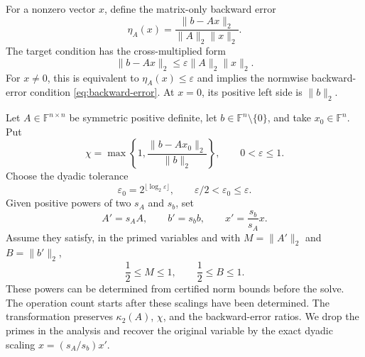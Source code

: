 \documentclass[11pt]{article}
\theoremstyle{definition}
\begin{document}
For a nonzero vector $x$, define the matrix-only backward error
\begin{equation}
 \eta_A(x)=\frac{\|b-Ax\|_2}{\|A\|_2\|x\|_2}.
 \label{eq:matrix-only-eta}
\end{equation}
The target condition has the cross-multiplied form
\begin{equation}
 \|b-Ax\|_2\le\varepsilon\|A\|_2\|x\|_2.
 \label{eq:matrix-only-cross}
\end{equation}
For $x\ne0$, this is equivalent to $\eta_A(x)\le\varepsilon$ and implies
the normwise backward-error condition \eqref{eq:backward-error}.
At $x=0$, its positive left side is $\|b\|_2$.

Let $A\in\mathbb F^{n\times n}$ be symmetric positive definite, let
$b\in\mathbb F^n\setminus\{0\}$, and take $x_0\in\mathbb F^n$.  Put
\[
 \chi=\max\left\{1,\frac{\|b-Ax_0\|_2}{\|b\|_2}\right\},
 \qquad 0<\varepsilon\le1.
\]
Choose the dyadic tolerance
\begin{equation}
 \varepsilon_0=2^{\lfloor\log_2\varepsilon\rfloor},
 \qquad \varepsilon/2<\varepsilon_0\le\varepsilon.
 \label{eq:dyadic-tolerance}
\end{equation}
Given positive powers of two $s_A$ and $s_b$, set
\begin{equation}
 A'=s_AA,\qquad b'=s_bb,\qquad x'=\frac{s_b}{s_A}x.
 \label{eq:cg-scaling-map}
\end{equation}
Assume they satisfy, in the primed variables and with
$M=\|A'\|_2$ and $B=\|b'\|_2$,
\begin{equation}
 \frac12\le M\le1,
 \qquad
 \frac12\le B\le1.
 \label{eq:cg-scaling}
\end{equation}
These powers can be determined from certified norm bounds before the
solve.  The operation count starts after these scalings have been determined.
The transformation preserves $\kappa_2(A)$, $\chi$, and the backward-error
ratios.  We drop the primes in the analysis and recover the original
variable by the exact dyadic scaling $x=(s_A/s_b)x'$.
\end{document}
